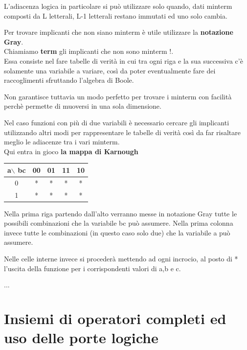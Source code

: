 \documentclass[a4paper]{book}
\begin{document}
L'adiacenza logica in particolare si può utilizzare solo quando, dati minterm composti da L letterali, L-1 letterali restano immutati ed uno solo cambia.

Per trovare implicanti che non siano minterm è utile utilizzare la \textbf{notazione Gray}.\\
Chiamiamo \textbf{term} gli implicanti che non sono minterm !.\\
Essa consiste nel fare tabelle di verità in cui tra ogni riga e la sua successiva c'è solamente una variabile a variare, così da poter eventualmente fare dei raccoglimenti sfruttando l'algebra di Boole.


Non garantisce tuttavia un modo perfetto per trovare i minterm con facilità perchè permette di muoversi in una sola dimensione.

\vspace{\baselineskip}

Nel caso funzioni con più di due variabili è necessario cercare gli implicanti utilizzando altri modi per rappresentare le tabelle di verità così da far risaltare meglio le adiacenze tra i vari minterm.\\
\vspace{\baselineskip}
Qui entra in gioco \textbf{la mappa di Karnough}
\vspace{\baselineskip}
\begin{tabular}{|c|c|c|c|c|}
\hline
a$\backslash$ bc & 00 & 01 & 11 & 10 \\
\hline
0              & *  & *  & *  & *  \\
\hline
1              & *  & *  & *  & *  \\
\hline
\end{tabular}
\vspace{\baselineskip}
Nella prima riga partendo dall'alto verranno messe in notazione Gray tutte le possibili combinazioni che la variabile bc può assumere.
Nella prima colonna invece tutte le combinazioni (in questo caso solo due) che la variabile a può assumere.

Nelle celle interne invece si procederà mettendo ad ogni incrocio, al posto di * l'uscita della funzione per i corrispondenti valori di a,b e c.


...


\newpage
\section{Insiemi di operatori completi ed uso delle porte logiche}
\end{document}
